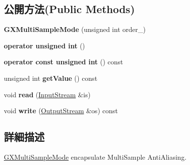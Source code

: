 \subsection*{公開方法(Public Methods)}
\begin{DoxyCompactItemize}
\item 
{\bfseries G\+X\+Multi\+Sample\+Mode} (unsigned int order\+\_)\hypertarget{class_i_dream_sky_1_1_g_x_multi_sample_mode_a6607ac6ebe2ab21be01f0657adc652d0}{}\label{class_i_dream_sky_1_1_g_x_multi_sample_mode_a6607ac6ebe2ab21be01f0657adc652d0}

\item 
{\bfseries operator unsigned int} ()\hypertarget{class_i_dream_sky_1_1_g_x_multi_sample_mode_a630b00b38238160c6655d6b1a8f70fd3}{}\label{class_i_dream_sky_1_1_g_x_multi_sample_mode_a630b00b38238160c6655d6b1a8f70fd3}

\item 
{\bfseries operator const unsigned int} () const \hypertarget{class_i_dream_sky_1_1_g_x_multi_sample_mode_aa5e29866d1dfc90b84bd56c03c93a1b0}{}\label{class_i_dream_sky_1_1_g_x_multi_sample_mode_aa5e29866d1dfc90b84bd56c03c93a1b0}

\item 
unsigned int {\bfseries get\+Value} () const \hypertarget{class_i_dream_sky_1_1_g_x_multi_sample_mode_a6f3be3c8f94f07b3ae3ab1682162f899}{}\label{class_i_dream_sky_1_1_g_x_multi_sample_mode_a6f3be3c8f94f07b3ae3ab1682162f899}

\item 
void {\bfseries read} (\hyperlink{class_i_dream_sky_1_1_input_stream}{Input\+Stream} \&is)\hypertarget{class_i_dream_sky_1_1_g_x_multi_sample_mode_a67e8977ececbf239d29aa15251f3a81c}{}\label{class_i_dream_sky_1_1_g_x_multi_sample_mode_a67e8977ececbf239d29aa15251f3a81c}

\item 
void {\bfseries write} (\hyperlink{class_i_dream_sky_1_1_output_stream}{Output\+Stream} \&os) const \hypertarget{class_i_dream_sky_1_1_g_x_multi_sample_mode_a16ebafdafd2b4b2f449a7b6f276bb70e}{}\label{class_i_dream_sky_1_1_g_x_multi_sample_mode_a16ebafdafd2b4b2f449a7b6f276bb70e}

\end{DoxyCompactItemize}


\subsection{詳細描述}
\hyperlink{class_i_dream_sky_1_1_g_x_multi_sample_mode}{G\+X\+Multi\+Sample\+Mode} encapsulate Multi\+Sample Anti\+Aliasing. 

